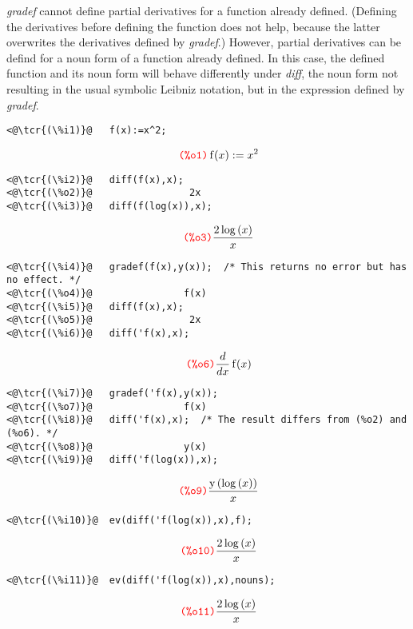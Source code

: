 \documentclass[../Maxima_Workbook.tex]{subfiles}
\begin{document}
\lz \emph{gradef} cannot define partial derivatives for a function already defined. (Defining the derivatives before defining the function does not help, because the latter overwrites the derivatives defined by \emph{gradef}.) However, partial derivatives can be defind for a noun form of a function already defined. In this case, the defined function and its noun form will behave differently under \emph{diff}, the noun form not resulting in the usual symbolic Leibniz notation, but in the expression defined by \emph{gradef}.

\lz \begin{small}
\color{blue} \leqn
\begin{lstlisting}
<@\tcr{(\%i1)}@   f(x):=x^2;
\end{lstlisting}
\vspace{-5mm} \[\tag*{\tcr{\ttfamily (\%o1)}} \operatorname{f}(x):={{x}^{2}} \]
\vspace{-7mm} \begin{lstlisting}
<@\tcr{(\%i2)}@   diff(f(x),x);
<@\tcr{(\%o2)}@			        2x
<@\tcr{(\%i3)}@   diff(f(log(x)),x);
\end{lstlisting}
\vspace{-5mm} \[\tag*{\tcr{\ttfamily (\%o3)}} \frac{2 \log{(x)}}{x} \]
\vspace{-5mm} \begin{lstlisting}
<@\tcr{(\%i4)}@   gradef(f(x),y(x));  /* This returns no error but has no effect. */
<@\tcr{(\%o4)}@			       f(x)
<@\tcr{(\%i5)}@   diff(f(x),x);
<@\tcr{(\%o5)}@			        2x
<@\tcr{(\%i6)}@   diff('f(x),x);
\end{lstlisting}
\vspace{-5mm} \[\tag*{\tcr{\ttfamily (\%o6)}} \frac{d}{d x} \operatorname{f}(x) \]
\vspace{-7mm} \begin{lstlisting}
<@\tcr{(\%i7)}@   gradef('f(x),y(x));
<@\tcr{(\%o7)}@			       f(x)
<@\tcr{(\%i8)}@   diff('f(x),x);  /* The result differs from (%o2) and (%o6). */
<@\tcr{(\%o8)}@			       y(x)
<@\tcr{(\%i9)}@   diff('f(log(x)),x);
\end{lstlisting}
\vspace{-5mm} \[\tag*{\tcr{\ttfamily (\%o9)}} \frac{\operatorname{y}\left( \log{(x)}\right) }{x} \]
\vspace{-7mm} \begin{lstlisting}
<@\tcr{(\%i10)}@  ev(diff('f(log(x)),x),f);
\end{lstlisting}
\vspace{-4mm} \[\tag*{\tcr{\ttfamily (\%o10)}} \frac{2 \log{(x)}}{x} \]
\vspace{-5mm} \begin{lstlisting}
<@\tcr{(\%i11)}@  ev(diff('f(log(x)),x),nouns);
\end{lstlisting}
\vspace{-3mm} \[\tag*{\tcr{\ttfamily (\%o11)}} \frac{2 \log{(x)}}{x} \]
\color{black} \reqn
\end{small} \vspace{-4mm}
\end{document}
